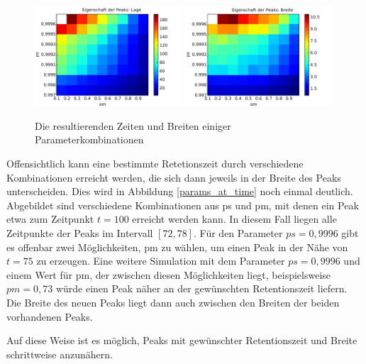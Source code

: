 \begin{figure}[h]
\includegraphics[width=0.49\textwidth]{bilder/erreichbare_Zeiten_2s}
\includegraphics[width=0.49\textwidth]{bilder/erreichbare_Breiten_2s}
\caption{Die resultierenden Zeiten und Breiten einiger Parameterkombinationen}
\label{heatmap_lage_breite}
\end{figure}

Offensichtlich kann eine bestimmte Retetionszeit durch verschiedene Kombinationen erreicht werden, die sich dann jeweils in der Breite des Peaks unterscheiden. Dies wird in Abbildung \ref{params_at_time} noch einmal deutlich. Abgebildet sind verschiedene Kombinationen aus ps und pm, mit denen ein Peak etwa zum Zeitpunkt $t=100$ erreicht werden kann. In diesem Fall liegen alle Zeitpunkte der Peaks im Intervall $[72, 78]$. Für den Parameter $ps = 0,9996$ gibt es offenbar zwei Möglichkeiten, pm zu wählen, um einen Peak in der Nähe von $t = 75$ zu erzeugen. Eine weitere Simulation mit dem Parameter $ps = 0,9996$ und einem Wert für pm, der zwischen diesen Möglichkeiten liegt, beispielsweise $pm = 0,73$ würde einen Peak näher an der gewünschten Retentionszeit liefern. Die Breite des neuen Peaks liegt dann auch zwischen den Breiten der beiden vorhandenen Peaks.

Auf diese Weise ist es möglich, Peaks mit gewünschter Retentionszeit und Breite schrittweise anzunähern. 

